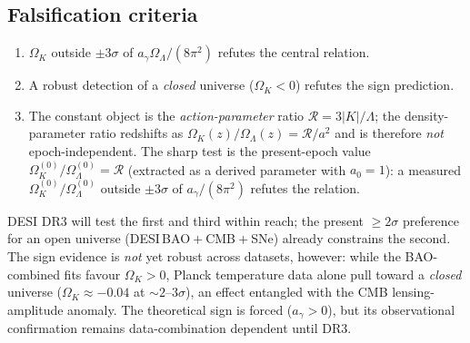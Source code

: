 \documentclass[11pt,a4paper]{article}
\theoremstyle{plain}
\theoremstyle{definition}
\theoremstyle{remark}
\newcommand{\Ok}{\Omega_K}
\newcommand{\OL}{\Omega_\Lambda}
\newcommand{\ag}{a_\gamma}
\begin{document}
\subsection{Falsification criteria}
\begin{enumerate}[leftmargin=*,nosep]
\item $\Ok$ outside $\pm 3\sigma$ of $\ag\OL/(8\pi^2)$ refutes the central relation.
\item A robust detection of a \emph{closed} universe ($\Ok < 0$) refutes the sign prediction.
\item The constant object is the \emph{action-parameter} ratio $\mathcal{R}=3|K|/\Lambda$; the
density-parameter ratio redshifts as $\Ok(z)/\OL(z)=\mathcal{R}/a^2$ and is therefore \emph{not}
epoch-independent. The sharp test is the present-epoch value $\Ok^{(0)}/\OL^{(0)}=\mathcal{R}$
(extracted as a derived parameter with $a_0=1$): a measured $\Ok^{(0)}/\OL^{(0)}$ outside
$\pm3\sigma$ of $\ag/(8\pi^2)$ refutes the relation.
\end{enumerate}
DESI DR3 will test the first and third within reach; the present $\ge 2\sigma$ preference for an
open universe (DESI\,BAO${}+{}$CMB${}+{}$SNe) already constrains the second. The sign evidence is
\emph{not} yet robust across datasets, however: while the BAO-combined fits favour
$\Ok>0$, Planck temperature data alone pull toward a \emph{closed} universe
($\Ok\approx-0.04$ at ${\sim}2$--$3\sigma$), an effect entangled with the CMB lensing-amplitude
anomaly. The theoretical sign is forced ($\ag>0$), but its observational confirmation remains
data-combination dependent until DR3.
\end{document}
